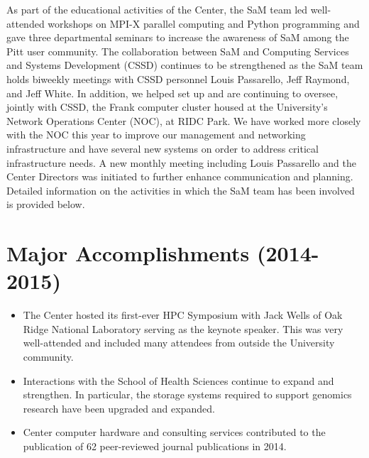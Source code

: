 As part of the educational activities of the Center, the SaM team led well-attended workshops on MPI-X parallel computing and Python programming and
gave three departmental seminars to increase the awareness of SaM among the
Pitt user community.  The collaboration between SaM and Computing Services and
Systems Development (CSSD) continues to be strengthened as the SaM team holds
biweekly meetings with CSSD personnel Louis Passarello, Jeff Raymond, and Jeff
White.  In addition, we helped set up and are continuing to oversee, jointly
with CSSD, the Frank computer cluster housed at the University's Network
Operations Center (NOC), at RIDC Park.  We have worked more closely with the NOC
this year to improve our management and networking infrastructure and have
several new systems on order to address critical infrastructure needs.  A new
monthly meeting including Louis Passarello and the Center Directors was
initiated to further enhance communication and planning.  Detailed information
on the activities in which the SaM team has been involved is provided below.


\section{Major Accomplishments (2014-2015)}

\begin{itemize}
    \item The Center hosted its first-ever HPC Symposium with Jack Wells of
          Oak Ridge National Laboratory serving as the keynote speaker.  This
          was very well-attended and included many attendees from outside the
          University community.

    \item Interactions with the School of Health Sciences continue to expand
	  and strengthen.  In particular, the storage systems required to
	  support genomics research have been upgraded and expanded.

    \item Center computer hardware and consulting services contributed to the
	  publication of 62 peer-reviewed journal publications in 2014.

\end{itemize}

